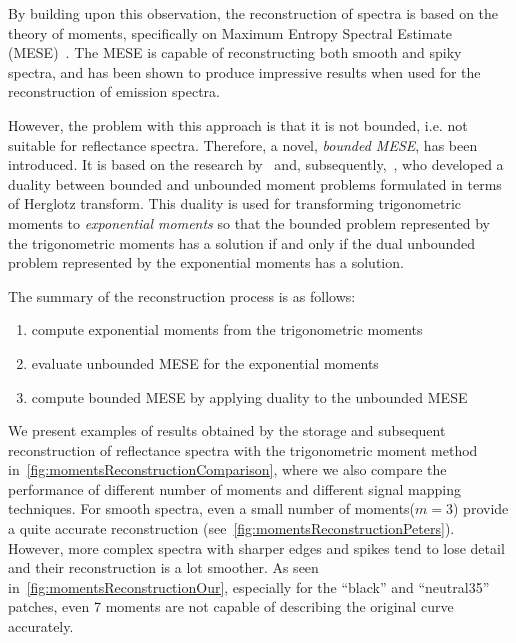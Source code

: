 By building upon this observation, the reconstruction of spectra is based on the theory of moments, specifically on Maximum Entropy Spectral Estimate (MESE)~\cite{unboundedMESEoriginal}. The MESE is capable of reconstructing both smooth and spiky spectra, and has been shown to produce impressive results when used for the reconstruction of emission spectra.

However, the problem with this approach is that it is not bounded, i.e. not suitable for reflectance spectra. Therefore, a novel, \emph{bounded MESE}, has been introduced. It is based on the research by~\citet{dualityBoundedUnboundedMarkoff} and, subsequently,~\citet{dualityBoundedUnboundedKrein}, who developed a duality between bounded and unbounded moment problems formulated in terms of Herglotz transform. This duality is used for transforming trigonometric moments to \emph{exponential moments} so that the bounded problem represented by the trigonometric moments has a solution if and only if the dual unbounded problem represented by the exponential moments has a solution.

The summary of the reconstruction process is as follows:
\begin{enumerate}
	\item compute exponential moments from the trigonometric moments
	\item evaluate unbounded MESE for the exponential moments
	\item compute bounded MESE by applying duality to the unbounded MESE
\end{enumerate}

We present examples of results obtained by the storage and subsequent reconstruction of reflectance spectra with the trigonometric moment method in~\cref{fig:momentsReconstructionComparison}, where we also compare the performance of different number of moments and different signal mapping techniques. For smooth spectra, even a small number of moments($m=3$) provide a quite accurate reconstruction (see~\cref{fig:momentsReconstructionPeters}). However, more complex spectra with sharper edges and spikes tend to lose detail and their reconstruction is a lot smoother. As seen in~\cref{fig:momentsReconstructionOur}, especially for the ``black'' and ``neutral35'' patches, even 7 moments are not capable of describing the original curve accurately.

